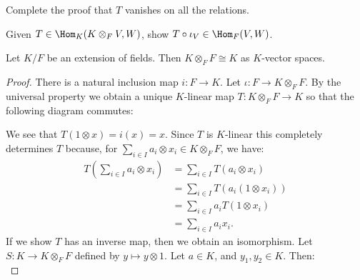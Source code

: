     \begin{exercise}
        Complete the proof that $T$ vanishes on all the relations.
    \end{exercise}

    \begin{exercise}
        Given $T \in \Hom_K(K \otimes_F V,W)$, show $T \circ \iota_V \in \Hom_F(V,W)$.
    \end{exercise}

    \begin{proposition}
        Let $K/F$ be an extension of fields. Then $K \otimes_F F \cong K$ as $K$-vector spaces. 
    \end{proposition}
        \begin{proof}
            There is a natural inclusion map $i: F \rightarrow K$. Let $\iota:F \rightarrow K \otimes_F F$. By the universal property we obtain a unique $K$-linear map $T: K \otimes_F F \rightarrow K$ so that the following diagram commutes:
                \begin{center}
                \end{center}
            We see that $T(1 \otimes x) = i(x)= x$. Since $T$ is $K$-linear this completely determines $T$ because, for $\sum_{i \in I}a_i \otimes x_i \in K \otimes_F F$, we have:
                \begin{equation*}
                \begin{split}
                    T \left(\sum_{i \in I}a_i \otimes x_i\right)
                    & = \sum_{i \in I}T(a_i \otimes x_i) \\
                    & = \sum_{i \in I}T(a_i(1 \otimes x_i)) \\
                    & = \sum_{i \in I} a_i T(1 \otimes x_i) \\
                    & = \sum_{i \in I}a_i x_i.
                \end{split}
                \end{equation*}
            If we show $T$ has an inverse map, then we obtain an isomorphism. Let $S:K \rightarrow K \otimes_F F$ defined by $y \mapsto y \otimes 1$. Let $a \in K$, and $y_1, y_2 \in K$. Then:
                \begin{equation*}

\end{equation*}
\end{proof}
